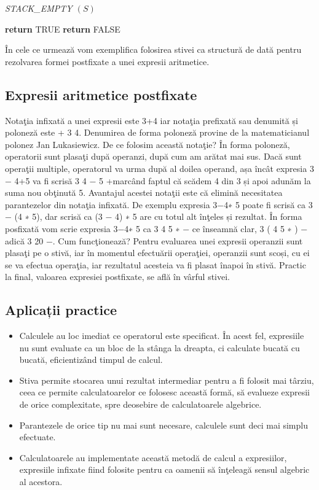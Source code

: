 \begin{algorithm} [H]
	\caption{\textit{STACK\_EMPTY $\left ( S \right )$}}\label{alg:stiva_verificare}
	\begin{algorithmic}[1]
		\State \textbf{return} TRUE	
		\Else 
		\State \textbf{return} FALSE
		\EndIf				
	\end{algorithmic}
\end{algorithm}

În cele ce urmează vom exemplifica folosirea stivei ca structură de dată pentru rezolvarea formei postfixate a unei expresii aritmetice.

\subsection{Expresii aritmetice postfixate}

Notaţia infixată a unei expresii este 3+4 iar notaţia prefixată sau denumită și poloneză este + 3 4. Denumirea de forma poloneză provine de la matematicianul polonez Jan Lukasiewicz. De ce folosim această notaţie? În forma poloneză, operatorii sunt plasaţi după operanzi, după cum am arătat mai sus. Dacă sunt operaţii multiple, operatorul va urma după al doilea operand, așa încât expresia 3 − 4+5 va fi scrisă 3 4 − 5 +marcând faptul că scădem 4 din 3 și apoi adunăm la suma nou obţinută 5. Avantajul acestei notaţii este că elimină necesitatea parantezelor din notaţia infixată. De exemplu expresia 3−4∗ 5 poate fi scrisă ca 3 − (4 ∗ 5), dar scrisă ca (3 − 4) ∗ 5 are cu totul alt înţeles și rezultat. În forma posfixată vom scrie expresia 3−4∗ 5 ca 3 4 5 ∗ − ce înseamnă clar, 3 ( 4 5 ∗ ) −
adică 3 20 −.
Cum funcţionează? Pentru evaluarea unei expresii operanzii sunt plasaţi pe o stivă, iar în
momentul efectuării operaţiei, operanzii sunt scoși, cu ei se va efectua operaţia, iar rezultatul acesteia va fi plasat înapoi în stivă. Practic la final, valoarea expresiei postfixate, se află în vârful stivei.

\subsection{Aplicații practice}

\begin{itemize}
	\item Calculele au loc imediat ce operatorul este specificat. În acest fel, expresiile nu sunt evaluate ca un bloc de la stânga la dreapta, ci calculate bucată cu bucată, eficientizând timpul de
	calcul.
	\item Stiva permite stocarea unui rezultat intermediar pentru a fi folosit mai târziu, ceea ce permite calculatoarelor ce folosesc această formă, să evalueze expresii de orice complexitate, spre deosebire de calculatoarele algebrice.
	\item Parantezele de orice tip nu mai sunt necesare, calculele sunt deci mai simplu efectuate.
	\item Calculatoarele au implementate această metodă de calcul a expresiilor, expresiile infixate fiind folosite pentru ca oamenii să înţeleagă sensul algebric al acestora.
\end{itemize}

